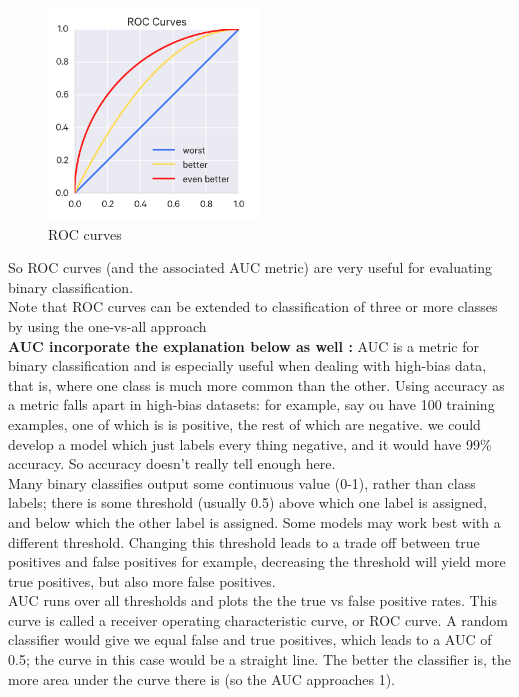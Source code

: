 \begin{figure}[H]
\centering
\includegraphics[width=0.5\textwidth]{img/roc.jpg}
\caption{ ROC curves }
\label{fig:bias2}
\end{figure}
So ROC curves (and the associated AUC metric) are very useful for evaluating binary classification.\\Note that ROC curves can be extended to classification of three or more classes by using the one-vs-all approach \\

\textbf{AUC incorporate the explanation below as well :}
AUC is a metric for binary classification and is especially useful when dealing with high-bias data, that is, where one class is much more common than the other. Using accuracy as a metric falls apart in high-bias datasets: for example, say ou have 100 training examples, one of which is is positive, the rest of which are negative. we could develop a model which just labels every thing negative, and it would have 99\% accuracy. So accuracy doesn't really tell  enough here.\\Many binary classifies output some continuous value (0-1), rather than class labels; there is some threshold (usually 0.5) above which one label is assigned, and below which the other label is assigned. Some models may work best with a different threshold. Changing this threshold leads to a trade off between true positives and false positives   for example, decreasing the threshold will yield more true positives, but also more false positives.\\AUC runs over all thresholds and plots the the true vs false positive rates. This curve is called a receiver operating characteristic curve, or ROC curve. A random classifier would give we equal false and true positives, which leads to a AUC of 0.5; the curve in this case would be a straight line. The better the classifier is, the more area under the curve there is (so the AUC approaches 1).

